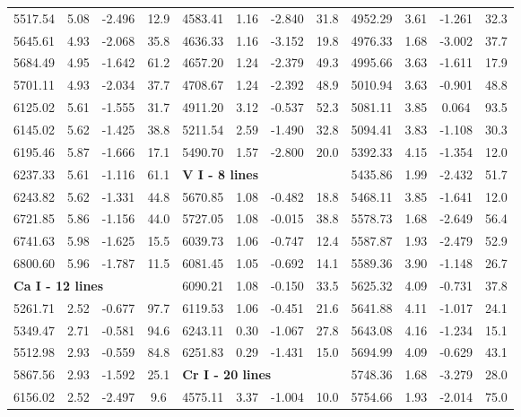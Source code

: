 \documentclass[dvips,12pt,a4paper]{report}
\begin{document}
{{\begin{table}[h]
\begin{tabular}{c c c c | c c c c | c c c c}
5517.54 & 5.08 & -2.496 &  12.9 & 4583.41 & 1.16 & -2.840 &  31.8 & 4952.29 & 3.61 & -1.261 &  32.3 \\
5645.61 & 4.93 & -2.068 &  35.8 & 4636.33 & 1.16 & -3.152 &  19.8 & 4976.33 & 1.68 & -3.002 &  37.7 \\
5684.49 & 4.95 & -1.642 &  61.2 & 4657.20 & 1.24 & -2.379 &  49.3 & 4995.66 & 3.63 & -1.611 &  17.9 \\
5701.11 & 4.93 & -2.034 &  37.7 & 4708.67 & 1.24 & -2.392 &  48.9 & 5010.94 & 3.63 & -0.901 &  48.8 \\
6125.02 & 5.61 & -1.555 &  31.7 & 4911.20 & 3.12 & -0.537 &  52.3 & 5081.11 & 3.85 &  0.064 &  93.5 \\
6145.02 & 5.62 & -1.425 &  38.8 & 5211.54 & 2.59 & -1.490 &  32.8 & 5094.41 & 3.83 & -1.108 &  30.3 \\
6195.46 & 5.87 & -1.666 &  17.1 & 5490.70 & 1.57 & -2.800 &  20.0 & 5392.33 & 4.15 & -1.354 &  12.0 \\
6237.33 & 5.61 & -1.116 &  61.1 & \multicolumn{3}{l}{\textbf{V I - 8 lines}} & & 5435.86 & 1.99 & -2.432 &  51.7 \\
6243.82 & 5.62 & -1.331 &  44.8 & 5670.85 & 1.08 & -0.482 &  18.8 & 5468.11 & 3.85 & -1.641 &  12.0 \\
6721.85 & 5.86 & -1.156 &  44.0 & 5727.05 & 1.08 & -0.015 &  38.8 & 5578.73 & 1.68 & -2.649 &  56.4 \\
6741.63 & 5.98 & -1.625 &  15.5 & 6039.73 & 1.06 & -0.747 &  12.4 & 5587.87 & 1.93 & -2.479 &  52.9 \\
6800.60 & 5.96 & -1.787 &  11.5 & 6081.45 & 1.05 & -0.692 &  14.1 & 5589.36 & 3.90 & -1.148 &  26.7 \\
\multicolumn{3}{l}{\textbf{Ca I - 12 lines}} &  & 6090.21 & 1.08 & -0.150 &  33.5 & 5625.32 & 4.09 & -0.731 &  37.8 \\
5261.71 & 2.52 & -0.677 &  97.7 & 6119.53 & 1.06 & -0.451 &  21.6 & 5641.88 & 4.11 & -1.017 &  24.1 \\
5349.47 & 2.71 & -0.581 &  94.6 & 6243.11 & 0.30 & -1.067 &  27.8 & 5643.08 & 4.16 & -1.234 &  15.1 \\
5512.98 & 2.93 & -0.559 &  84.8 & 6251.83 & 0.29 & -1.431 &  15.0 & 5694.99 & 4.09 & -0.629 &  43.1 \\
5867.56 & 2.93 & -1.592 &  25.1 & \multicolumn{3}{l}{\textbf{Cr I - 20 lines}} &  & 5748.36 & 1.68 & -3.279 &  28.0 \\
6156.02 & 2.52 & -2.497 &   9.6 & 4575.11 & 3.37 & -1.004 &  10.0 & 5754.66 & 1.93 & -2.014 &  75.0 \\

\end{tabular}
\end{table}}}
\end{document}

